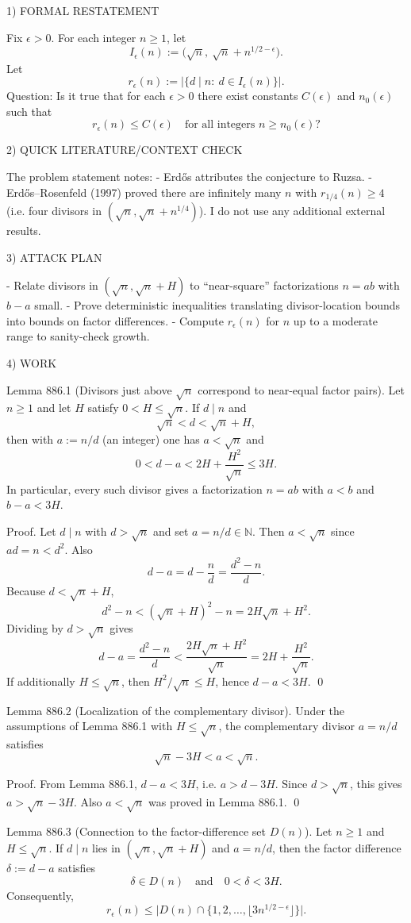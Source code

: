 1) FORMAL RESTATEMENT

Fix $\epsilon>0$. For each integer $n\ge 1$, let
\[I_{\epsilon}(n):=\big(\sqrt n,\ \sqrt n+n^{1/2-\epsilon}\big).
\]
Let
\[r_{\epsilon}(n):=\big|\{d\mid n:\ d\in I_{\epsilon}(n)\}\big|.
\]
Question: Is it true that for each $\epsilon>0$ there exist constants $C(\epsilon)$ and $n_0(\epsilon)$ such that
\[r_{\epsilon}(n)\le C(\epsilon)\quad\text{for all integers }n\ge n_0(\epsilon)?
\]

2) QUICK LITERATURE/CONTEXT CHECK

The problem statement notes:
- Erd\H{o}s attributes the conjecture to Ruzsa.
- Erd\H{o}s--Rosenfeld (1997) proved there are infinitely many $n$ with $r_{1/4}(n)\ge 4$ (i.e. four divisors in $(\sqrt n,\sqrt n+n^{1/4})$).
I do not use any additional external results.

3) ATTACK PLAN

- Relate divisors in $(\sqrt n,\sqrt n+H)$ to “near-square” factorizations $n=ab$ with $b-a$ small.
- Prove deterministic inequalities translating divisor-location bounds into bounds on factor differences.
- Compute $r_{\epsilon}(n)$ for $n$ up to a moderate range to sanity-check growth.

4) WORK

Lemma 886.1 (Divisors just above $\sqrt n$ correspond to near-equal factor pairs).
Let $n\ge 1$ and let $H$ satisfy $0<H\le \sqrt n$.
If $d\mid n$ and
\[\sqrt n<d<\sqrt n+H,\]
then with $a:=n/d$ (an integer) one has $a<\sqrt n$ and
\[0<d-a<2H+\frac{H^2}{\sqrt n} \le 3H.
\]
In particular, every such divisor gives a factorization $n=ab$ with $a<b$ and $b-a<3H$.

Proof.
Let $d\mid n$ with $d>\sqrt n$ and set $a=n/d\in\mathbb N$. Then $a<\sqrt n$ since $ad=n<d^2$.
Also
\[d-a = d-\frac{n}{d}=\frac{d^2-n}{d}.
\]
Because $d<\sqrt n+H$,
\[d^2-n < (\sqrt n+H)^2-n = 2H\sqrt n+H^2.
\]
Dividing by $d>\sqrt n$ gives
\[d-a=\frac{d^2-n}{d} < \frac{2H\sqrt n+H^2}{\sqrt n}=2H+\frac{H^2}{\sqrt n}.
\]
If additionally $H\le \sqrt n$, then $H^2/\sqrt n\le H$, hence $d-a<3H$. \qed

Lemma 886.2 (Localization of the complementary divisor).
Under the assumptions of Lemma 886.1 with $H\le \sqrt n$, the complementary divisor $a=n/d$ satisfies
\[\sqrt n-3H<a<\sqrt n.
\]

Proof.
From Lemma 886.1, $d-a<3H$, i.e. $a>d-3H$.
Since $d>\sqrt n$, this gives $a>\sqrt n-3H$. Also $a<\sqrt n$ was proved in Lemma 886.1. \qed

Lemma 886.3 (Connection to the factor-difference set $D(n)$).
Let $n\ge 1$ and $H\le \sqrt n$.
If $d\mid n$ lies in $(\sqrt n,\sqrt n+H)$ and $a=n/d$, then the factor difference $\delta:=d-a$ satisfies
\[\delta\in D(n)\quad\text{and}\quad 0<\delta<3H.
\]
Consequently,
\[r_{\epsilon}(n)\le \big|D(n)\cap\{1,2,\dots,\lfloor 3n^{1/2-\epsilon}\rfloor\}\big|.
\]

